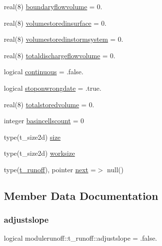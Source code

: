 \begin{DoxyCompactItemize}
real(8) \mbox{\hyperlink{structmodulerunoff_1_1t__runoff_ac18460b4cafb6905193e70ca70c45ff6}{boundaryflowvolume}} = 0.
\item 
real(8) \mbox{\hyperlink{structmodulerunoff_1_1t__runoff_adf99b757fd16db5037778285f91d6fb6}{volumestoredinsurface}} = 0.
\item 
real(8) \mbox{\hyperlink{structmodulerunoff_1_1t__runoff_aed3b92f9908d35e0ca6de377562309bf}{volumestoredinstormsystem}} = 0.
\item 
real(8) \mbox{\hyperlink{structmodulerunoff_1_1t__runoff_a7fa648f0053c30a539863643673a46a4}{totaldischargeflowvolume}} = 0.
\item 
logical \mbox{\hyperlink{structmodulerunoff_1_1t__runoff_a9f5ca667a9c24db7a7e5793f9f85a42b}{continuous}} = .false.
\item 
logical \mbox{\hyperlink{structmodulerunoff_1_1t__runoff_a06ceb74a1d08621f4656e7b61a07e1de}{stoponwrongdate}} = .true.
\item 
real(8) \mbox{\hyperlink{structmodulerunoff_1_1t__runoff_ac822ad3e3e68366722e99329ee21ea21}{totalstoredvolume}} = 0.
\item 
integer \mbox{\hyperlink{structmodulerunoff_1_1t__runoff_a5bf6cb4785dc1293e3482d95b9f02f23}{basincellscount}} = 0
\item 
type(t\+\_\+size2d) \mbox{\hyperlink{structmodulerunoff_1_1t__runoff_a44b103876e05382327a83e70fe827f18}{size}}
\item 
type(t\+\_\+size2d) \mbox{\hyperlink{structmodulerunoff_1_1t__runoff_a661491d498286923ef73a051b5bab036}{worksize}}
\item 
type(\mbox{\hyperlink{structmodulerunoff_1_1t__runoff}{t\+\_\+runoff}}), pointer \mbox{\hyperlink{structmodulerunoff_1_1t__runoff_afa77250a1a53a77f98e77de164630901}{next}} =$>$ null()
\end{DoxyCompactItemize}


\subsection{Member Data Documentation}
\mbox{\label{structmodulerunoff_1_1t__runoff_aa5fb157b4c037191ea92aa22bd9319a7}} 
\subsubsection{\texorpdfstring{adjustslope}{adjustslope}}
{\footnotesize\ttfamily logical modulerunoff\+::t\+\_\+runoff\+::adjustslope = .false.\hspace{0.3cm}{\ttfamily [private]}}

